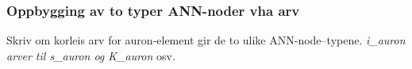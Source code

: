	











	
	\subsubsection{Oppbygging av to typer ANN-noder vha arv}
	Skriv om korleis arv for auron-element gir de to ulike ANN-node--typene. \emph{i\_auron arver til s\_auron og K\_auron} osv.

